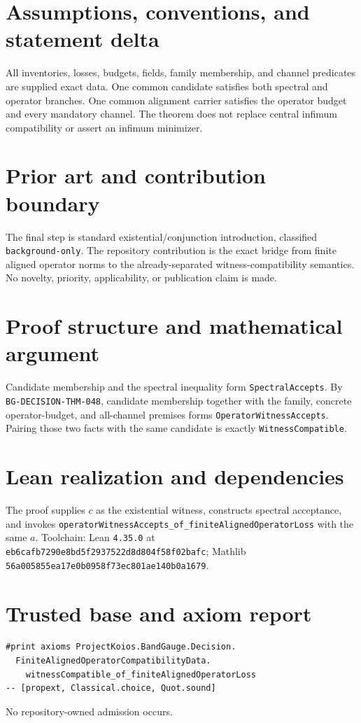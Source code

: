 \documentclass[11pt]{article}
\begin{document}
\section{Assumptions, conventions, and statement delta}
All inventories, losses, budgets, fields, family membership, and channel predicates are supplied exact data.  One common candidate satisfies both spectral and operator branches.  One common alignment carrier satisfies the operator budget and every mandatory channel.  The theorem does not replace central infimum compatibility or assert an infimum minimizer.

\section{Prior art and contribution boundary}
The final step is standard existential/conjunction introduction, classified \texttt{background-only}.  The repository contribution is the exact bridge from finite aligned operator norms to the already-separated witness-compatibility semantics.  No novelty, priority, applicability, or publication claim is made.

\section{Proof structure and mathematical argument}
Candidate membership and the spectral inequality form \texttt{SpectralAccepts}.  By \texttt{BG-DECISION-THM-048}, candidate membership together with the family, concrete operator-budget, and all-channel premises forms \texttt{OperatorWitnessAccepts}.  Pairing those two facts with the same candidate is exactly \texttt{WitnessCompatible}.

\section{Lean realization and dependencies}
The proof supplies $c$ as the existential witness, constructs spectral acceptance, and invokes \texttt{operatorWitnessAccepts\_of\_finiteAlignedOperatorLoss} with the same $a$.  Toolchain: Lean \texttt{4.35.0} at \texttt{eb6cafb7290e8bd5f2937522d8d804f58f02bafc}; Mathlib \texttt{56a005855ea17e0b0958f73ec801ae140b0a1679}.

\section{Trusted base and axiom report}
\begin{verbatim}
#print axioms ProjectKoios.BandGauge.Decision.
  FiniteAlignedOperatorCompatibilityData.
    witnessCompatible_of_finiteAlignedOperatorLoss
-- [propext, Classical.choice, Quot.sound]
\end{verbatim}
No repository-owned admission occurs.
\end{document}
